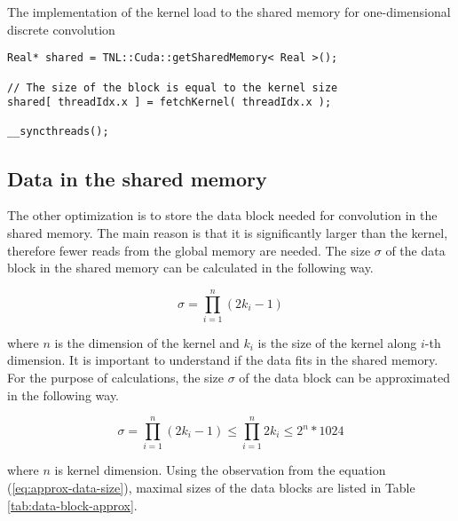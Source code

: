 \begin{listing}[!h]
  \caption{The implementation of the kernel load to the shared memory for one-dimensional discrete convolution}
  \begin{verbatim}
Real* shared = TNL::Cuda::getSharedMemory< Real >();

// The size of the block is equal to the kernel size
shared[ threadIdx.x ] = fetchKernel( threadIdx.x );

__syncthreads();
\end{verbatim}
\end{listing}

\subsection{Data in the shared memory}

The other optimization is to store the data block needed for convolution in the shared memory.
The main reason is that it is significantly larger than the kernel, therefore fewer reads from the global memory are needed.
The size \(\sigma\) of the data block in the shared memory can be calculated in the following way.

\begin{equation}
  \sigma = \prod_{i=1}^n (2k_i - 1)
\end{equation}

where \(n\) is the dimension of the kernel and \(k_i\) is the size of the kernel along \(i\)-th dimension.
It is important to understand if the data fits in the shared memory.
For the purpose of calculations, the size \(\sigma\) of the data block can be approximated in the following way.

\begin{equation} \label{eq:approx-data-size}
  \sigma = \prod_{i=1}^n (2 k_i - 1) \le \prod_{i=1}^n  2k_i \le 2^n * 1024
\end{equation}

where \(n\) is kernel dimension.
Using the observation from the equation (\ref{eq:approx-data-size}), maximal sizes of the data blocks are listed in Table \ref{tab:data-block-approx}.

